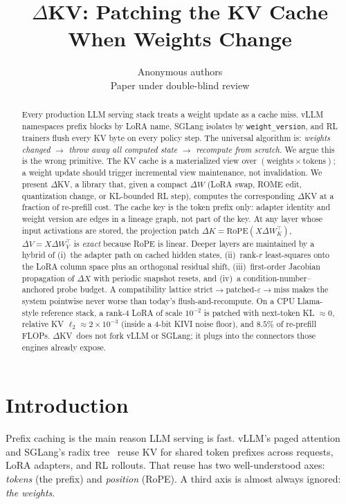 \documentclass{article}
\title{$\Delta$KV: Patching the KV Cache When Weights Change}
\author{Anonymous authors\\
Paper under double-blind review}
\newcommand{\dkv}{$\Delta$KV}
\begin{document}
\maketitle

\begin{abstract}
Every production LLM serving stack treats a weight update as a cache miss.
vLLM namespaces prefix blocks by LoRA name, SGLang isolates by
\texttt{weight\_version}, and RL trainers flush every KV byte on every
policy step. The universal algorithm is: \emph{weights changed $\to$ throw
away all computed state $\to$ recompute from scratch.}
We argue this is the wrong primitive.
The KV cache is a materialized view over $(\text{weights}\times\text{tokens})$;
a weight update should trigger incremental view maintenance, not invalidation.
We present \dkv, a library that, given a compact $\Delta W$
(LoRA swap, ROME edit, quantization change, or KL-bounded RL step),
computes the corresponding $\Delta$KV at a fraction of re-prefill cost.
The cache key is the token prefix only: adapter identity and weight version
are edges in a lineage graph, not part of the key.
At any layer whose input activations are stored, the projection patch
$\Delta K=\mathrm{RoPE}(X\Delta W_K^\top)$, $\Delta V=X\Delta W_V^\top$ is
\emph{exact} because RoPE is linear.
Deeper layers are maintained by a hybrid of (i)~the adapter path on cached
hidden states, (ii)~rank-$r$ least-squares onto the LoRA column space plus
an orthogonal residual shift, (iii)~first-order Jacobian propagation of
$\Delta X$ with periodic snapshot resets, and (iv)~a
condition-number--anchored probe budget.
A compatibility lattice $\mathrm{strict}\to\mathrm{patched}\text{-}\varepsilon\to\mathrm{miss}$
makes the system pointwise never worse than today's flush-and-recompute.
On a CPU Llama-style reference stack, a rank-4 LoRA of scale $10^{-2}$ is
patched with next-token KL $\approx 0$, relative KV $\ell_2\approx 2\times 10^{-3}$
(inside a 4-bit KIVI noise floor), and $8.5\%$ of re-prefill FLOPs.
\dkv\ does not fork vLLM or SGLang; it plugs into the connectors those
engines already expose.
\end{abstract}

\section{Introduction}
\label{sec:intro}

Prefix caching is the main reason LLM serving is fast.
vLLM's paged attention~\citep{kwon2023vllm} and SGLang's radix
tree~\citep{zheng2024sglang} reuse KV for shared token prefixes across
requests, LoRA adapters, and RL rollouts.
That reuse has two well-understood axes: \emph{tokens} (the prefix) and
\emph{position} (RoPE).
A third axis is almost always ignored: \emph{the weights}.
\end{document}

